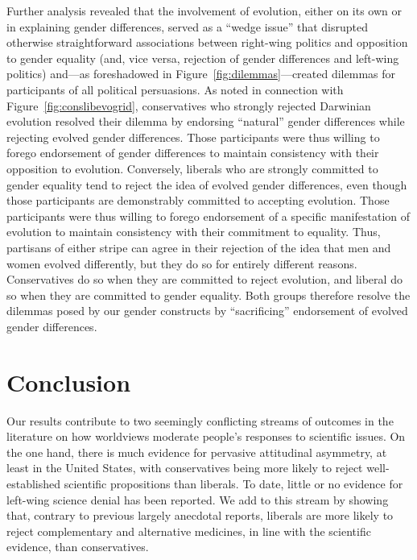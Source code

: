 \documentclass[fignum,man]{apa}\usepackage[]{graphicx}\usepackage[]{color}
\begin{document}
Further analysis revealed that the involvement of evolution, 
either on its own or in explaining
gender differences, served as a ``wedge issue'' that disrupted
otherwise straightforward associations between right-wing politics
and opposition to gender equality (and, vice versa, rejection of
gender differences and left-wing politics) and---as foreshadowed
in Figure~\ref{fig:dilemmas}---created 
dilemmas for participants of all political persuasions.
As noted in connection with
Figure~\ref{fig:conslibevogrid},
conservatives who strongly
rejected Darwinian evolution resolved their dilemma by 
endorsing 
``natural'' gender differences while rejecting
evolved gender differences. Those participants were
thus willing to forego endorsement of gender differences to maintain
consistency with their opposition to evolution. 
Conversely, liberals who are strongly committed to gender equality
tend to reject the idea of evolved gender differences, even though
those participants are demonstrably committed to accepting evolution.
Those 
participants were
thus willing to forego endorsement of a specific manifestation of evolution
to maintain
consistency with their commitment to equality.
Thus, partisans of either stripe can agree in their rejection of the idea that men and
women evolved differently, but they do so for entirely different
reasons. Conservatives do so when they are committed to reject evolution, and liberal do 
so when they are committed to gender equality. Both groups therefore resolve the dilemmas
posed by our gender constructs by ``sacrificing'' endorsement of evolved gender
differences.

\section{Conclusion}
Our results contribute to two seemingly conflicting streams 
of outcomes in the literature on 
how worldviews moderate people's responses to scientific issues. 
On the one hand, there is much evidence for pervasive attitudinal
asymmetry, at least in the United States, with conservatives 
being more likely to reject
well-established scientific propositions than liberals. To date,
little or no evidence for left-wing science denial has been reported.
We add to this stream by showing that, contrary to previous largely
anecdotal reports, liberals are more likely to reject complementary
and alternative medicines, in line with the scientific evidence, than
conservatives. 
\end{document}
